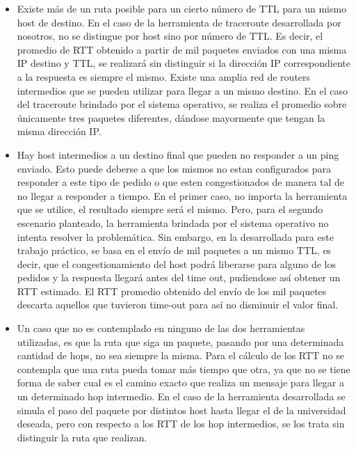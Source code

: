 \begin{itemize}
\item Existe más de un ruta posible para un cierto número de TTL para un mismo host de destino. En el caso de la herramienta de traceroute desarrollada por nosotros, no se distingue por host sino por número de TTL. Es decir, el promedio de RTT obtenido a partir de mil paquetes enviados con una misma IP destino y TTL, se realizará sin distinguir si la dirección IP correspondiente a la respuesta es siempre el mismo. Existe una amplia red de routers intermedios que se pueden utilizar para llegar a un mismo destino. En el caso del traceroute brindado por el sistema operativo, se realiza el promedio sobre únicamente tres paquetes diferentes, dándose mayormente que tengan la misma dirección IP. 

\item Hay host intermedios a un destino final que pueden no responder a un ping enviado. Esto puede deberse a que los mismos no estan configurados para responder a este tipo de pedido o que esten congestionados de manera tal de no llegar a responder a tiempo. En el primer caso, no importa la herramienta que se utilice, el resultado siempre será el mismo. Pero, para el segundo escenario planteado, la herramienta brindada por el sistema operativo no intenta resolver la problemática. Sin embargo, en la desarrollada para este trabajo práctico, se basa en el envío de mil paquetes a un mismo TTL, es decir, que el congestionamiento del host podrá liberarse para alguno de los pedidos y la respuesta llegará antes del time out, pudiendose así obtener un RTT estimado. El RTT promedio obtenido del envío de los mil paquetes descarta aquellos que tuvieron time-out para así no disminuir el valor final.

\item Un caso que no es contemplado en ninguno de las dos herramientas utilizadas, es que la ruta que siga un paquete, pasando por una determinada cantidad de hops, no sea siempre la misma. Para el cálculo de los RTT no se contempla que una ruta pueda tomar más tiempo que otra, ya que no se tiene forma de saber cual es el camino exacto que realiza un mensaje para llegar a un determinado hop intermedio. En el caso de la herramienta desarrollada se simula el paso del paquete por distintos host hasta llegar el de la universidad deseada, pero con respecto a los RTT de los hop intermedios, se los trata sin distinguir la ruta que realizan. 
\end{itemize}



